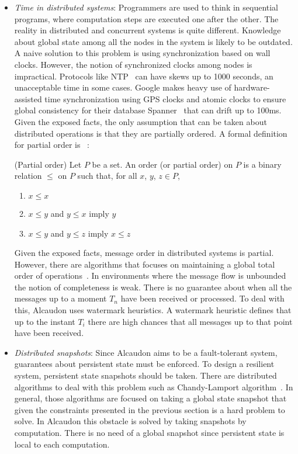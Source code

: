 \begin{itemize}
\item \textit{Time in distributed systems}:
  Programmers are used to think in sequential programs, where computation steps
  are executed one after the other. The reality in distributed and concurrent
  systems is quite different. Knowledge about global state among all the nodes
  in the system is likely to be outdated. A naive solution to this problem is
  using synchronization based on wall clocks. However, the notion of
  synchronized clocks among nodes is impractical. Protocols like \ac{NTP}~\cite{ntp}
  can have skews up to 1000 seconds, an unacceptable time in some cases. Google
  makes heavy use of hardware-assisted time synchronization using GPS clocks and
  atomic clocks to ensure global consistency for their database
  Spanner~\cite{180268} that can drift up to 100ms. Given the exposed facts, the
  only assumption that can be taken about distributed operations is that they are partially
  ordered. A formal definition for partial order is ~\cite{book:lattices}:
  \begin{definition}{(Partial order)}
    Let $P$ be a set. An order (or partial order) on $P$ is a binary relation
    $\leq$ on $P$ such that, for all $x$, $y$, $z \in P$,
    \begin{enumerate}
    \item $x \leq x$
    \item $x \leq y$ and $y \leq x$ imply $y$
    \item $x \leq y$ and $y \leq z$ imply $x \leq z$
    \end{enumerate}
  \end{definition}
  Given the exposed facts, message order in distributed systems is partial.
  However, there are algorithms that focuses on maintaining a global total order
  of operations~\cite{vclocks}. In environments where the message flow is unbounded
  the notion of completeness is weak. There is no guarantee about when all the
  messages up to a moment $T_n$ have been received or processed. To deal with
  this, Alcaudon uses watermark heuristics. A watermark heuristic defines that up
  to the instant $T_i$ there are high chances that all messages up to that point
  have been received.
\item \textit{Distributed snapshots}:
  Since Alcaudon aims to be a fault-tolerant system, guarantees about persistent
  state must be enforced. To design a resilient system, persistent state
  snapshots should be taken. There are distributed algorithms to deal with this
  problem such as Chandy-Lamport algorithm~\cite{lampsnapshot}. In general, those algorithms are focused
  on taking a global state snapshot that given the constraints presented in the
  previous section is a hard problem to solve. In Alcaudon this obstacle is
  solved by taking snapshots by computation. There is no need of a global
  snapshot since persistent state is local to each computation.


\end{itemize}
